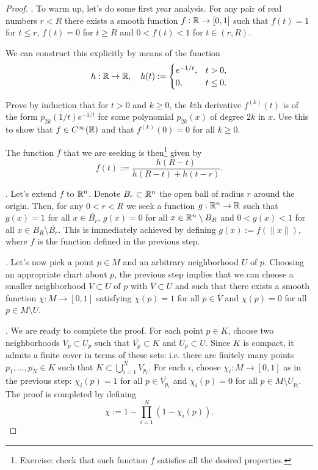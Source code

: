 \begin{proof}
  .
  To warm up, let's do some first year analysis.
  For any pair of real numbers $r < R$ there exists a smooth function $f: \mathbb{R} \to [0,1]$ such that $f(t) = 1$ for $t \leq r$, $f(t) = 0$ for $t \geq R$ and $0<f(t)<1$ for $t\in(r,R)$.
  
  We can construct this explicitly by means of the function
  \begin{equation}
    h:\mathbb{R}\to\mathbb{R}, \quad h(t):= \begin{cases}
      e^{-1/t}, & t>0,\\
      0, & t \leq 0.
    \end{cases}
  \end{equation}

  \begin{exe}
    Prove by induction that for $t>0$ and $k\geq 0$, the $k$th derivative $f^{(k)}(t)$ is of the form $p_{2k}(1/t)e^{-1/t}$ for some polynomial $p_{2k}(x)$ of degree $2k$ in $x$.
    Use this to show that $f\in C^\infty(\mathbb{R})$ and that $f^{(k)}(0) = 0$ for all $k\geq 0$.
  \end{exe}

  The function $f$ that we are seeking is then\footnote{Exercise: check that such function $f$ satisfies all the desired properties.} given by
  \begin{equation}
    f(t) := \frac{h(R-t)}{h(R-t) + h(t-r)}.
  \end{equation}

  .
  Let's extend $f$ to $\mathbb{R}^n$.
  Denote $B_r \subset \mathbb{R}^n$ the open ball of radius $r$ around the origin.
  Then, for any $0 < r < R$ we seek a function $g:\mathbb{R}^n\to\mathbb{R}$ such that $g(x) = 1$ for all $x\in \overline{B_r}$, $g(x) = 0$ for all $x\in \mathbb{R}^n\setminus B_R$ and $0< g(x)< 1$ for all $x\in B_R\setminus\overline{B_r}$.
  This is immediately achieved by defining $g(x) := f(\|x\|)$, where $f$ is the function defined in the previous step.

  .
  Let's now pick a point $p\in M$ and an arbitrary neighborhood $U$ of $p$. Choosing an appropriate chart about $p$, the previous step implies that we can choose a smaller neighborhood $V\subset U$ of $p$ with $\overline V\subset U$ and such that there exists a smooth function $\chi: M \to [0,1]$ satisfying $\chi(p) = 1$ for all $p\in\overline{V}$ and $\chi(p) = 0$ for all $p\in M\setminus U$.
  
  .
  We are ready to complete the proof.
  For each point $p\in K$, choose two neighborhoods $V_p \subset U_p$ such that $\overline{V_p}\subset K$ and $U_p \subset U$.
  Since $K$ is compact, it admits a finite cover in terms of these sets: i.e. there are finitely many points $p_1, \ldots, p_N \in K$ such that $K \subset \bigcup_{i=1}^N V_{p_i}$.
  For each $i$, choose $\chi_i: M \to [0,1]$ as in the previous step: $\chi_i(p) = 1$ for all $p\in\overline{V_{p_i}}$ and $\chi_i(p) = 0$ for all $p\in M\setminus U_{p_i}$.
  The proof is completed by defining
  \begin{equation}
    \chi := 1 - \prod_{i=1}^N(1 - \chi_i(p)).
  \end{equation}
\end{proof}

